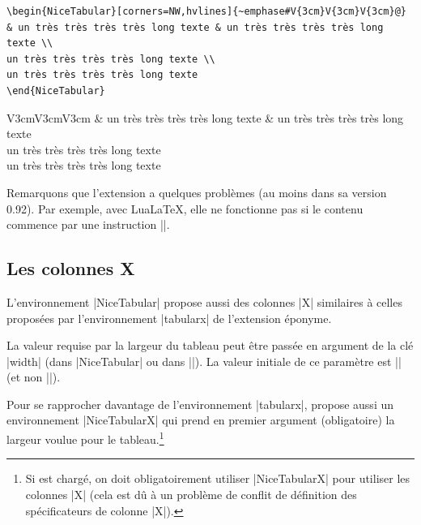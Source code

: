 \documentclass[dvipsnames]{article}%
\begin{document}
\medskip
\begin{Verbatim}
\begin{NiceTabular}[corners=NW,hvlines]{~emphase#V{3cm}V{3cm}V{3cm}@}
& un très très très très long texte & un très très très très long texte \\
un très très très très long texte \\
un très très très très long texte 
\end{NiceTabular}
\end{Verbatim}

\medskip
\begin{center}
\begin{NiceTabular}[corners=NW,hvlines]{V{3cm}V{3cm}V{3cm}}
& un très très très très long texte & un très très très très long texte \\
un très très très très long texte \\
un très très très très long texte 
\end{NiceTabular}
\end{center}


Remarquons que l'extension  a quelques problèmes (au moins dans sa
version 0.92). Par exemple, avec LuaLaTeX, elle ne fonctionne pas si le contenu
commence par une instruction |\color|.

\subsection{Les colonnes X}


\label{colonne-X}

L'environnement |{NiceTabular}| propose aussi des colonnes |X| similaires à
celles proposées par l'environnement |{tabularx}| de l'extension éponyme.

La valeur requise par la largeur du tableau peut être passée en argument de la
clé |width| (dans |{NiceTabular}| ou dans |\NiceMatrixOptions|). La valeur
initiale de ce paramètre est |\linewidth| (et non |\textwidth|).

Pour se rapprocher davantage de l'environnement |{tabularx}|, 
propose aussi un environnement |{NiceTabularX}| qui prend en premier argument
(obligatoire) la largeur voulue pour le tableau.\footnote{Si  est
  chargé, on doit obligatoirement utiliser |{NiceTabularX}| pour utiliser les
  colonnes |X| (cela est dû à un problème de conflit de définition des
  spécificateurs de colonne |X|).}
\end{document}
